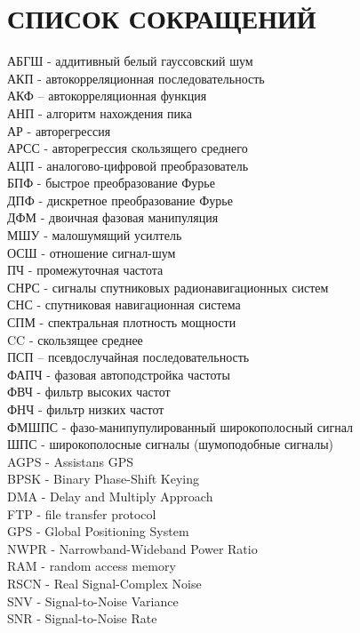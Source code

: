 \section*{СПИСОК СОКРАЩЕНИЙ}
\noindent
АБГШ - аддитивный белый гауссовский шум				\\
АКП - автокорреляционная последовательность			\\
АКФ – автокорреляционная функция				\\
АНП - алгоритм нахождения пика					\\
АР - авторегрессия						\\
АРСС - авторегрессия скользящего среднего			\\
АЦП - аналогово-цифровой преобразователь			\\
БПФ - быстрое преобразование Фурье				\\
ДПФ - дискретное преобразование Фурье				\\
ДФМ - двоичная фазовая манипуляция				\\
МШУ - малошумящий усилтель					\\
ОСШ - отношение сигнал-шум 					\\
ПЧ - промежуточная частота					\\
СНРС - сигналы спутниковых радионавигационных систем		\\
СНС - спутниковая навигационная система				\\
СПМ - спектральная плотность мощности				\\
CC - скользящее среднее						\\
ПСП – псевдослучайная последовательность			\\
ФАПЧ - фазовая автоподстройка частоты				\\
ФВЧ - фильтр высоких частот					\\
ФНЧ - фильтр низких частот					\\
ФМШПС - фазо-манипупулированный широкополосный сигнал		\\
ШПС -  широкополосные сигналы (шумоподобные сигналы)		\\

\noindent
AGPS - Assistans GPS						\\
BPSK - Binary Phase-Shift Keying				\\
DMA - Delay and Multiply Approach				\\
FTP - file transfer protocol					\\
GPS - Global Positioning System					\\
NWPR - Narrowband-Wideband Power Ratio				\\
RAM - random access memory					\\
RSCN - Real Signal-Complex Noise				\\
SNV - Signal-to-Noise Variance					\\
SNR - Signal-to-Noise Rate					\\

\newpage
